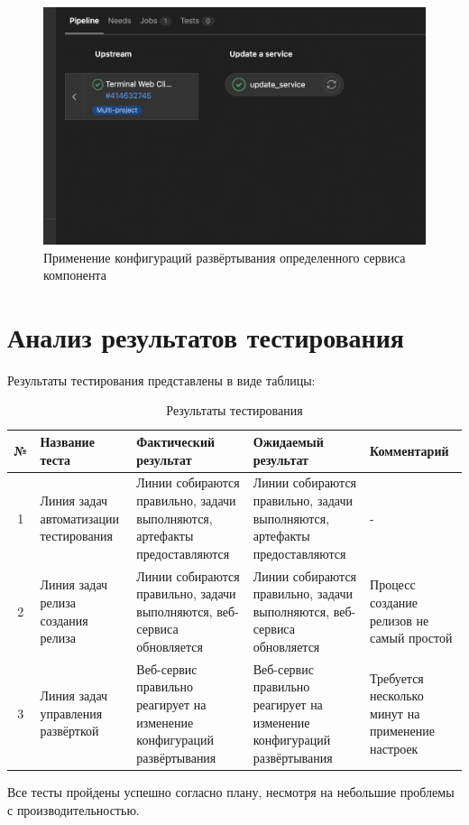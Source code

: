 \begin{enumerate}
    \begin{figure}[ht]
        \centering
        \includegraphics[scale=0.6]{src/figures/qa-deploy-service}
        \caption{Применение конфигураций развёртывания определенного сервиса компонента}
        \label{fig:qa-deploy-service}
    \end{figure}
\end{enumerate}

\section{Анализ результатов тестирования}

Результаты тестирования представлены в виде таблицы:

\begin{center}
    \begin{longtable}{|c|p{}|p{}|p{}|p{}|}
        \caption{Результаты тестирования}
        \label{tab:testing-res}
        \hline
        № & Название теста & Фактический результат & Ожидаемый результат & Комментарий                                                   \\
        \hline
        1 & Линия задач автоматизации тестирования  & Линии собираются правильно, задачи выполняются, артефакты предоставляются & Линии собираются правильно, задачи выполняются, артефакты предоставляются & - \\
        \hline
        2 & Линия задач релиза создания релиза  & Линии собираются правильно, задачи выполняются, веб-сервиса обновляется & Линии собираются правильно, задачи выполняются, веб-сервиса обновляется & Процесс создание релизов не самый простой  \\
        \hline
        3 & Линия задач управления развёрткой  & Веб-сервис правильно реагирует на изменение конфигураций развёртывания & Веб-сервис правильно реагирует на изменение конфигураций развёртывания & Требуется несколько минут на применение настроек \\
        \hline
    \end{longtable}
\end{center}

Все тесты пройдены успешно согласно плану, несмотря на небольшие проблемы с производительностью.

